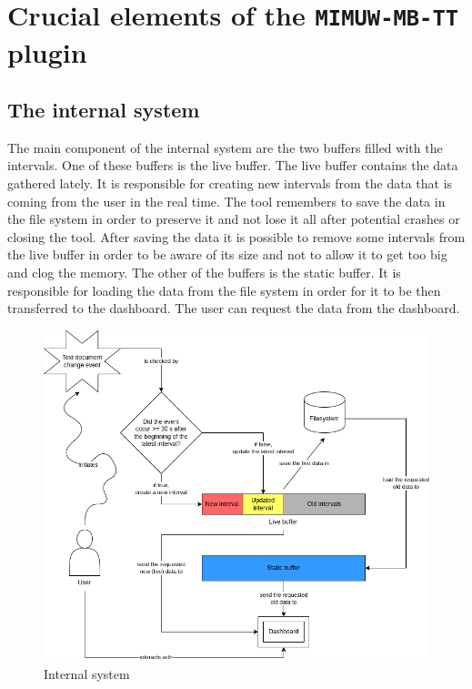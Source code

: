 \section{Crucial elements of the \texttt{MIMUW-MB-TT} plugin}

\subsection{The internal system}\label{subsec:internal_system}

The main component of the internal system are the two buffers filled with the intervals. One of these buffers is the live buffer. The live buffer contains the data gathered lately. It is responsible for creating new intervals from the data that is coming from the user in the real time. The tool remembers to save the data in the file system in order to preserve it and not lose it all after potential crashes or closing the tool. After saving the data it is possible to remove some intervals from the live buffer in order to be aware of its size and not to allow it to get too big and clog the memory. The other of the buffers is the static buffer. It is responsible for loading the data from the file system in order for it to be then transferred to the dashboard. The user can request the data from the dashboard.

\begin{figure}[ht]
  \centering
  \includegraphics[scale=0.4]{chapters/methodology/graphics/internal-system.png}
  \caption{Internal system}
  \label{fig:internal_system}
\end{figure}

